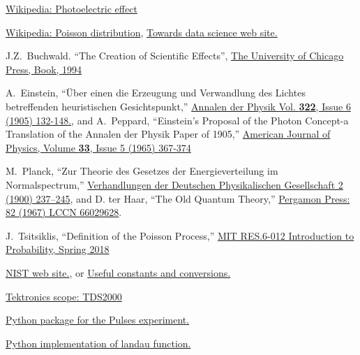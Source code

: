 \documentclass[10pt,aps,twocolumn,secnumarabic,balancelastpage,amsmath,amssymb,nofootinbib,floatfix]{revtex4}
\begin{document}

%
%

\begin{thebibliography}{99}

  \href{https://en.wikipedia.org/wiki/Photoelectric\_effect}{Wikipedia: Photoelectric effect}

  \href{https://en.wikipedia.org/wiki/Poisson\_distribution}{Wikipedia: Poisson distribution},
  \href{https://towardsdatascience.com/the-poisson-distribution-and-poisson-process-explained-4e2cb17d459}%
       {Towards data science web site.}

  J.Z.~Buchwald.
  ``The Creation of Scientific Effects'',
  \href{https://press.uchicago.edu/ucp/books/book/chicago/C/bo3636276.html}%
       {The University of Chicago Press, Book, 1994}

  A.~Einstein,
  ``\"Uber einen die Erzeugung und Verwandlung des Lichtes betreffenden heuristischen Gesichtspunkt,''
  \href{http://users.physik.fu-berlin.de/~kleinert/files/eins\_lq.pdf}%
       {Annalen der Physik Vol. {\bf 322}, Issue 6 (1905) 132-148.}, and
  A.~Peppard,
  ``Einstein's Proposal of the Photon Concept-a Translation of the Annalen der Physik Paper of 1905,''
  \href{https://aapt.scitation.org/doi/10.1119/1.1971542}%
       {American Journal of Physics, Volume {\bf 33}, Issue 5 (1965) 367-374}

  M.~Planck,
  ``Zur Theorie des Gesetzes der Energieverteilung im Normalspectrum,''
  \href{https://archive.org/stream/verhandlungende01goog#page/n247/mode/2up}{Verhandlungen der Deutschen Physikalischen Gesellschaft 2 (1900) 237–245}, and
  D. ter Haar,
  ``The Old Quantum Theory,''
  \href{https://openlibrary.org/books/OL5997151M/The\_old\_quantum\_theory}{Pergamon Press: 82 (1967) LCCN 66029628}.

  J.~Tsitsiklis,
  ``Definition of the Poisson Process,''
  \href{https://www.youtube.com/watch?v=D\_EGYzqmapc}{MIT RES.6-012 Introduction to Probability, Spring 2018}

  \href{https://physics.nist.gov/cgi-bin/cuu/Value?h}{NIST web site.}, or
  \href{http://www.physics.rutgers.edu/~abrooks/342/constants.html}{Useful constants and conversions.}

  \href{https://www.tek.com/oscilloscope/tds2000-digital-storage-oscilloscope}{Tektronics scope: TDS2000}

  \href{https://github.com/JLabMit/JLabExperiments/tree/master/Pulses/python}{Python package for the Pulses experiment.}

  \href{https://pypi.org/project/pylandau/}{Python implementation of landau function.}

\end{thebibliography}
\end{document}
